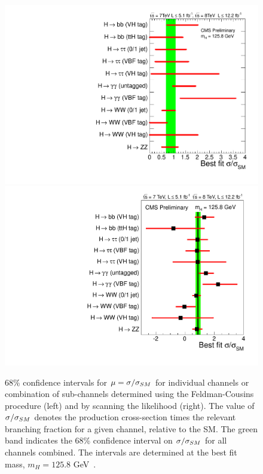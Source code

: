\begin{figure}
\begin{center}
\includegraphics[width=.49\textwidth]{combinations/sqr_fc_ccc.pdf}
\includegraphics[width=.49\textwidth]{combinations/sqr_mlz_ccc_mH125.pdf}
\end{center}
\caption{68\% confidence intervals for $\mu=\sigma/\sigma_{SM}$ for individual 
channels or combination of sub-channels determined using the Feldman-Cousins procedure (left) 
and by scanning the likelihood (right). The value of $\sigma/\sigma_{SM}$ denotes
the production cross-section times the relevant branching fraction for a given 
channel, relative to the SM. The green band indicates the 68\% confidence interval
on $\sigma/\sigma_{SM}$ for all channels combined. The intervals are determined at the best fit 
mass, $m_{H}=125.8$ GeV~\citep{HIG-12-045}.}
\label{fig:fc1d}
\end{figure}


